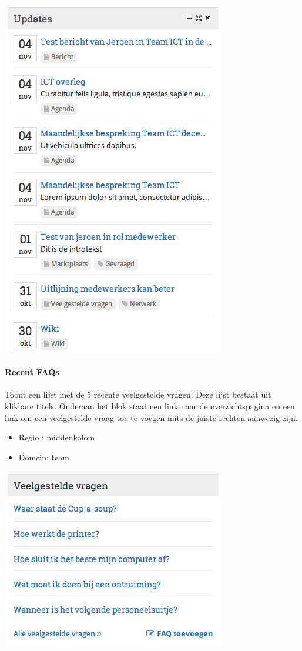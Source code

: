 \begin{center}
	\includegraphics[scale=0.5]{img/blokken/updates.png}
\end{center}

\paragraph{Recent FAQs}

Toont een lijst met de 5 recente veelgestelde vragen. Deze lijst bestaat uit klikbare titels. Onderaan het blok staat een link naar de overzichtspagina en een link om een veelgestelde vraag toe te voegen mits de juiste rechten aanwezig zijn.

\begin{itemize}
\item Regio : middenkolom
\item Domein: team
\end{itemize}

\begin{center}
	\includegraphics[scale=0.5]{img/blokken/faq.png}
\end{center}

